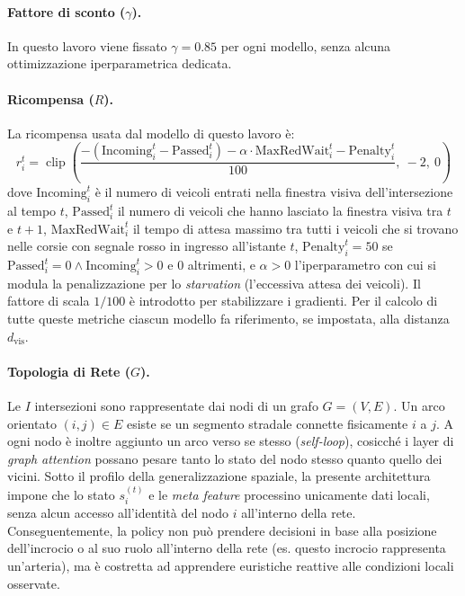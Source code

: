 \paragraph{Fattore di sconto ($\gamma$).} In questo lavoro viene fissato $\gamma = 0.85$ per ogni modello, senza alcuna ottimizzazione iperparametrica dedicata.

\paragraph{Ricompensa ($R$).} La ricompensa usata dal modello di questo lavoro è:
\begin{equation}
  r_i^t = \operatorname{clip}\!\left(
  \frac{-(\mathrm{Incoming}_i^t - \mathrm{Passed}_i^t) - \alpha \cdot \mathrm{MaxRedWait}_i^t - \mathrm{Penalty}_i^t}{100},\ -2,\ 0
  \right)
  \label{eq:reward-custom}
\end{equation}
dove
$\mathrm{Incoming}_i^t$ è il numero di veicoli entrati nella finestra visiva dell'intersezione al tempo $t$,
$\mathrm{Passed}_i^t$ il numero di veicoli che hanno lasciato la finestra visiva tra $t$ e $t{+}1$,
$\mathrm{MaxRedWait}_i^t$ il tempo di attesa massimo tra tutti i veicoli che si trovano nelle corsie con segnale rosso in ingresso all'istante $t$,
$\mathrm{Penalty}_i^t = 50$ se \\ $\mathrm{Passed}_i^t = 0 \land \mathrm{Incoming}_i^t > 0$ e $0$ altrimenti,
e $\alpha > 0$ l'iperparametro con cui si modula la penalizzazione per lo \emph{starvation} (l'eccessiva attesa dei veicoli).
Il fattore di scala $1/100$ è introdotto per stabilizzare i gradienti.
Per il calcolo di tutte queste metriche ciascun modello fa riferimento, se impostata, alla distanza $d_{\text{vis}}$.

\paragraph{Topologia di Rete ($G$).} Le $I$ intersezioni sono rappresentate dai nodi di un grafo $G=(V,E)$.
Un arco orientato $(i,j) \in E$ esiste se un segmento stradale connette fisicamente $i$ a $j$.
A ogni nodo è inoltre aggiunto un arco verso se stesso (\emph{self-loop}), cosicché i layer di \emph{graph attention} possano pesare tanto lo stato del nodo stesso quanto quello dei vicini.
Sotto il profilo della generalizzazione spaziale, la presente architettura impone che
lo stato $s_i^{(t)}$ e le \emph{meta feature} processino unicamente dati locali,
senza alcun accesso all'identità del nodo $i$ all'interno della rete.
Conseguentemente, la policy non può prendere decisioni in base alla posizione dell'incrocio o al suo ruolo all'interno della rete (es. questo incrocio rappresenta un'arteria),
ma è costretta ad apprendere euristiche reattive alle condizioni locali osservate.

